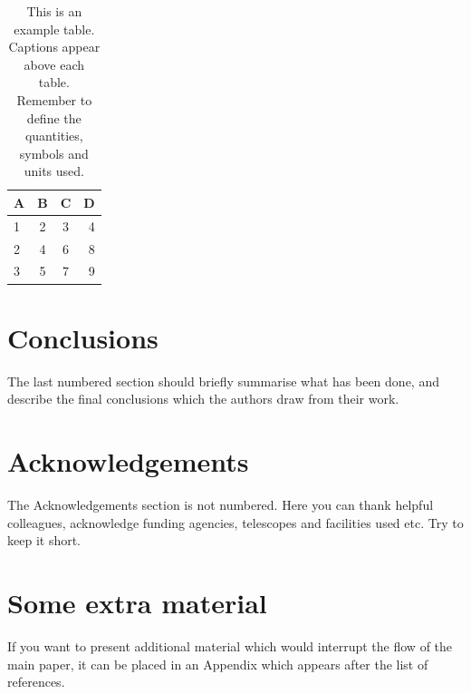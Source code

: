 \documentclass[a4paper,fleqn,usenatbib]{mnras}
\begin{document}
\begin{table}
	\centering
	\caption{This is an example table. Captions appear above each table.
	Remember to define the quantities, symbols and units used.}
	\label{tab:example_table}
	\begin{tabular}{lccr} %
		\hline
		A & B & C & D\\
		\hline
		1 & 2 & 3 & 4\\
		2 & 4 & 6 & 8\\
		3 & 5 & 7 & 9\\
		\hline
	\end{tabular}
\end{table}


\section{Conclusions}

The last numbered section should briefly summarise what has been done, and describe
the final conclusions which the authors draw from their work.

\section*{Acknowledgements}

The Acknowledgements section is not numbered. Here you can thank helpful
colleagues, acknowledge funding agencies, telescopes and facilities used etc.
Try to keep it short.










\appendix

\section{Some extra material}

If you want to present additional material which would interrupt the flow of the main paper,
it can be placed in an Appendix which appears after the list of references.



\bsp	%
\label{lastpage}
\end{document}
